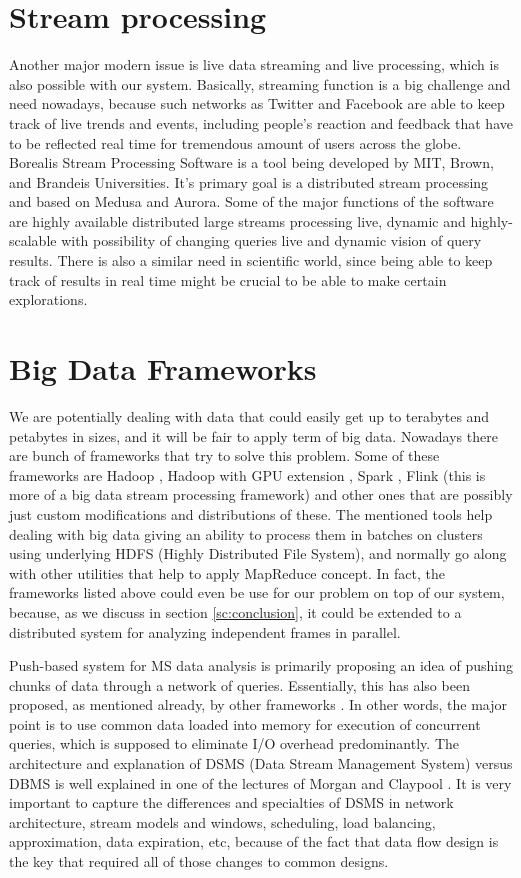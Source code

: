 \documentclass[11pt,a4paper]{report}
\begin{document}
\section{Stream processing}
Another major modern issue is live data streaming and live processing, which is also possible with our system. Basically, streaming function is a big challenge and need nowadays, because such networks as Twitter and Facebook are able to keep track of live trends and events, including people's reaction and feedback that have to be reflected real time for tremendous amount of users across the globe. Borealis Stream Processing Software is a tool being developed by MIT, Brown, and Brandeis Universities. It's primary goal is a distributed stream processing and based on Medusa and Aurora. Some of the major functions of the software are highly available distributed large streams processing live, dynamic and highly-scalable with possibility of changing queries live and dynamic vision of query results. \cite{borealis} There is also a similar need in scientific world, since being able to keep track of results in real time might be crucial to be able to make certain explorations. 

\section{Big Data Frameworks}

We are potentially dealing with data that could easily get up to terabytes and petabytes in sizes, and it will be fair to apply term of big data. Nowadays there are bunch of frameworks that try to solve this problem. Some of these frameworks are Hadoop \cite{hadoop}, Hadoop with GPU extension \cite{hadoopgpu}, Spark \cite{spark}, Flink \cite{flink} (this is more of a big data stream processing framework) and other ones that are possibly just custom modifications and distributions of these. The mentioned tools help dealing with big data giving an ability to process them in batches on clusters using underlying HDFS (Highly Distributed File System), and normally go along with other utilities that help to apply MapReduce concept. In fact, the frameworks listed above could even be use for our problem on top of our system, because, as we discuss in section \ref{sc:conclusion}, it could be extended to a distributed system for analyzing independent frames in parallel.

Push-based system for MS data analysis is primarily proposing an idea of pushing chunks of data through a network of queries. Essentially, this has also been proposed, as mentioned already, by other frameworks \cite{DataPath,Volcano,Qpipe}. In other words, the major point is to use common data loaded into memory for execution of concurrent queries, which is supposed to eliminate I/O overhead predominantly. The architecture and explanation of DSMS (Data Stream Management System) versus DBMS is well explained in one of the lectures of Morgan and Claypool \cite{DataStreamManagement}. It is very important to capture the differences and specialties of DSMS in network architecture, stream models and windows, scheduling, load balancing, approximation, data expiration, etc, because of the fact that data flow design is the key that required all of those changes to common designs.
\end{document}
